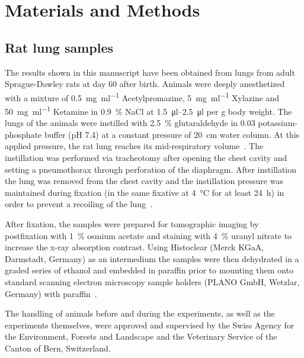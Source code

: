 \documentclass[%
	twoside,
	paper=a4,%
	abstract=true,%
	]{scrartcl}
\begin{document}
\section{Materials and Methods}
\subsection{Rat lung samples}
The results shown in this manuscript have been obtained from lungs from adult Sprague-Dawley rats at day 60 after birth. Animals were deeply anesthetized with a mixture of %
\SI{0.5}{\milli\gram\per\milli\litre} Acetylpromazine, %
\SI{5}{\milli\gram\per\milli\litre} Xylazine and %
\SI{50}{\milli\gram\per\milli\litre} Ketamine in %
\SI{0.9}{\percent} NaCl at \SIrange{1.5}{2.5}{\micro\litre} per \si{\gram} body weight. The lungs of the animals were instilled with \SI{2.5}{\percent} glutaraldehyde in \SI{0.03}{\Molar} potassium-phosphate buffer (pH 7.4) at a constant pressure of \SI{20}{\centi\meter} water column. At this applied pressure, the rat lung reaches its mid-respiratory volume~\cite{Schittny1998}. The instillation was performed via tracheotomy after opening the chest cavity and setting a pneumothorax through perforation of the diaphragm. After instillation the lung was removed from the chest cavity and the instillation pressure was maintained during fixation (in the same fixative at \SI{4}{\celsius} for at least \SI{24}{\hour}) in order to prevent a recoiling of the lung~\cite{Tschanz2002}.

After fixation, the samples were prepared for tomographic imaging by postfixation with \SI{1}{\percent} osmium acetate and staining with \SI{4}{\percent} uranyl nitrate to increase the x-ray absorption contrast. Using Histoclear (Merck KGaA, Darmstadt, Germany) as an intermedium the samples were then dehydrated in a graded series of ethanol and embedded in paraffin prior to mounting them onto standard scanning electron microscopy sample holders (PLANO GmbH, Wetzlar, Germany) with paraffin~\cite{Tsuda2008}.

The handling of animals before and during the experiments, as well as the experiments themselves, were approved and supervised by the Swiss Agency for the Environment, Forests and Landscape and the Veterinary Service of the Canton of Bern, Switzerland.
\end{document}
